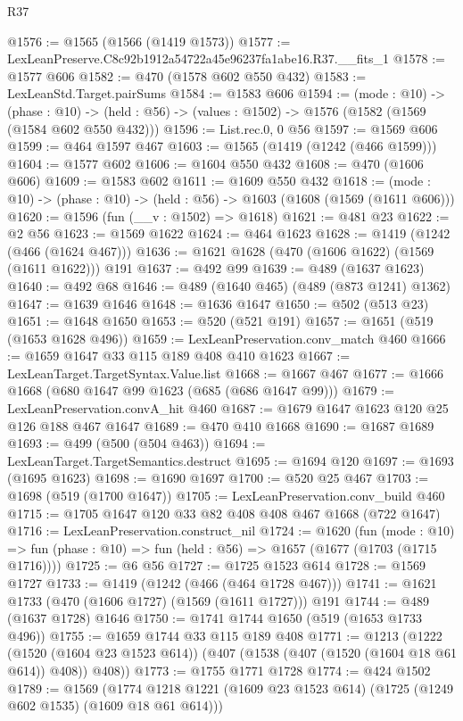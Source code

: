 \begin{lexlean}{R37}
\begin{coremodule}
@1576 := @1565 (@1566 (@1419 @1573))
@1577 := LexLeanPreserve.C8c92b1912a54722a45e96237fa1abe16.R37.__fits_1
@1578 := @1577 @606
@1582 := @470 (@1578 @602 @550 @432)
@1583 := LexLeanStd.Target.pairSums
@1584 := @1583 @606
@1594 := (mode : @10) ->
  (phase : @10) -> (held : @56) -> (values : @1502) -> @1576 (@1582 (@1569 (@1584 @602 @550 @432)))
@1596 := List.rec.{0, 0} @56
@1597 := @1569 @606
@1599 := @464 @1597 @467
@1603 := @1565 (@1419 (@1242 (@466 @1599)))
@1604 := @1577 @602
@1606 := @1604 @550 @432
@1608 := @470 (@1606 @606)
@1609 := @1583 @602
@1611 := @1609 @550 @432
@1618 := (mode : @10) -> (phase : @10) -> (held : @56) -> @1603 (@1608 (@1569 (@1611 @606)))
@1620 := @1596 (fun (__v : @1502) => @1618)
@1621 := @481 @23
@1622 := @2 @56
@1623 := @1569 @1622
@1624 := @464 @1623
@1628 := @1419 (@1242 (@466 (@1624 @467)))
@1636 := @1621 @1628 (@470 (@1606 @1622) (@1569 (@1611 @1622))) @191
@1637 := @492 @99
@1639 := @489 (@1637 @1623)
@1640 := @492 @68
@1646 := @489 (@1640 @465) (@489 (@873 @1241) @1362)
@1647 := @1639 @1646
@1648 := @1636 @1647
@1650 := @502 (@513 @23)
@1651 := @1648 @1650
@1653 := @520 (@521 @191)
@1657 := @1651 (@519 (@1653 @1628 @496))
@1659 := LexLeanPreservation.conv_match @460
@1666 := @1659 @1647 @33 @115 @189 @408 @410 @1623
@1667 := LexLeanTarget.TargetSyntax.Value.list
@1668 := @1667 @467
@1677 := @1666 @1668 (@680 @1647 @99 @1623 (@685 (@686 @1647 @99)))
@1679 := LexLeanPreservation.convA_hit @460
@1687 := @1679 @1647 @1623 @120 @25 @126 @188 @467 @1647
@1689 := @470 @410 @1668
@1690 := @1687 @1689
@1693 := @499 (@500 (@504 @463))
@1694 := LexLeanTarget.TargetSemantics.destruct
@1695 := @1694 @120
@1697 := @1693 (@1695 @1623)
@1698 := @1690 @1697
@1700 := @520 @25 @467
@1703 := @1698 (@519 (@1700 @1647))
@1705 := LexLeanPreservation.conv_build @460
@1715 := @1705 @1647 @120 @33 @82 @408 @408 @467 @1668 (@722 @1647)
@1716 := LexLeanPreservation.construct_nil
@1724 := @1620
    (fun (mode : @10) =>
    fun (phase : @10) => fun (held : @56) => @1657 (@1677 (@1703 (@1715 @1716))))
@1725 := @6 @56
@1727 := @1725 @1523 @614
@1728 := @1569 @1727
@1733 := @1419 (@1242 (@466 (@464 @1728 @467)))
@1741 := @1621 @1733 (@470 (@1606 @1727) (@1569 (@1611 @1727))) @191
@1744 := @489 (@1637 @1728) @1646
@1750 := @1741 @1744 @1650 (@519 (@1653 @1733 @496))
@1755 := @1659 @1744 @33 @115 @189 @408
@1771 := @1213
    (@1222
      (@1520 (@1604 @23 @1523 @614))
      (@407 (@1538 (@407 (@1520 (@1604 @18 @61 @614)) @408)) @408))
@1773 := @1755 @1771 @1728
@1774 := @424 @1502
@1789 := @1569
    (@1774 @1218 @1221 (@1609 @23 @1523 @614) (@1725 (@1249 @602 @1535) (@1609 @18 @61 @614)))

\end{coremodule}
\end{lexlean}

